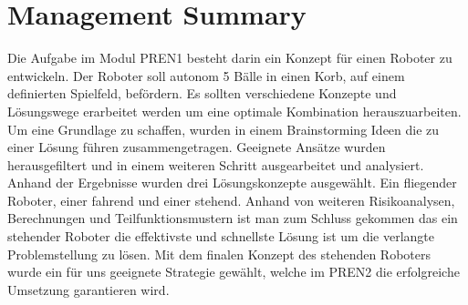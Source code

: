 \section{Management Summary}
Die Aufgabe im Modul PREN1 besteht darin ein Konzept für einen Roboter zu entwickeln. Der Roboter soll autonom 5 Bälle in einen Korb, auf einem definierten Spielfeld, befördern. Es sollten verschiedene Konzepte und Lösungswege erarbeitet werden um eine optimale Kombination herauszuarbeiten. Um eine Grundlage zu schaffen, wurden in einem Brainstorming Ideen die zu einer Lösung führen zusammengetragen. Geeignete Ansätze wurden herausgefiltert und in einem weiteren Schritt ausgearbeitet und analysiert. Anhand der Ergebnisse wurden drei Lösungskonzepte ausgewählt. Ein fliegender Roboter, einer fahrend und einer stehend. Anhand von weiteren Risikoanalysen, Berechnungen und Teilfunktionsmustern ist man zum Schluss gekommen das ein stehender Roboter die effektivste und schnellste Lösung ist um die verlangte Problemstellung zu lösen. Mit dem finalen Konzept des stehenden Roboters wurde ein für uns geeignete Strategie gewählt, welche im PREN2 die erfolgreiche Umsetzung garantieren wird.